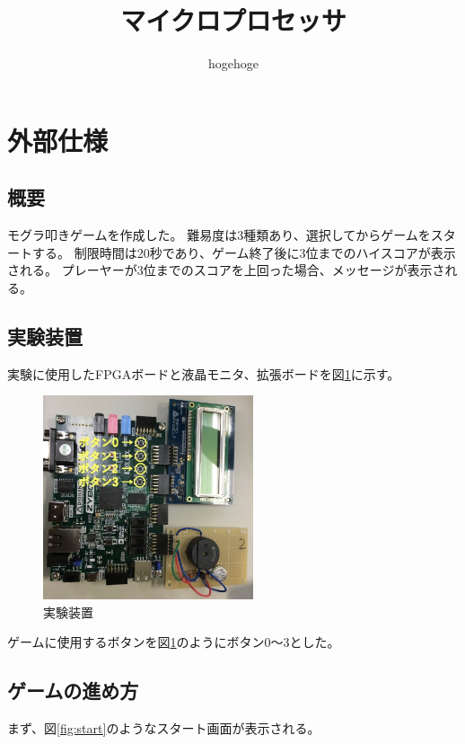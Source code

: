 \documentclass[11pt,a4j]{jsarticle}
\makeatletter
\newcommand{\figcaption}[1]{\def\@captype{figure}\caption{#1}}
\makeatother
\begin{document}
\title{マイクロプロセッサ}
\author{hogehoge}
\maketitle


\section{外部仕様}
\label{sec:外部仕様}

\subsection{概要}
\label{sub:概要}

モグラ叩きゲームを作成した。
難易度は3種類あり、選択してからゲームをスタートする。
制限時間は20秒であり、ゲーム終了後に3位までのハイスコアが表示される。
プレーヤーが3位までのスコアを上回った場合、メッセージが表示される。

\subsection{実験装置}
\label{sub:実験装置}
実験に使用したFPGAボードと液晶モニタ、拡張ボードを図\ref{fig:machine}に示す。

\begin{figure}[H]
  \centering
  \includegraphics[height=60mm,bb=0 0 795 769]{img/machine.png}
  \figcaption{実験装置}
  \label{fig:machine}
\end{figure}

ゲームに使用するボタンを図\ref{fig:machine}のようにボタン0～3とした。

\subsection{ゲームの進め方}
\label{sub:ゲームの進め方}

まず、図\ref{fig:start}のようなスタート画面が表示される。
\end{document}
